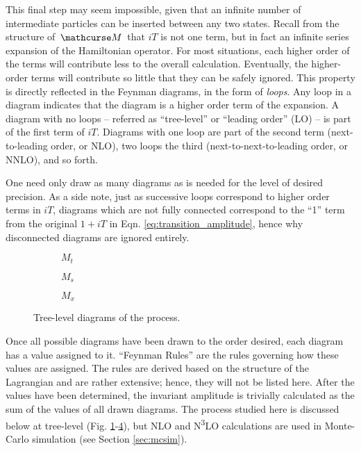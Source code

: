     This final step may seem impossible, given that an infinite number of intermediate particles can be inserted between any two states.
    Recall from the structure of $\invAmp$ that $iT$ is not one term, but in fact an infinite series expansion of the Hamiltonian operator.
    For most situations, each higher order of the terms will contribute less to the overall calculation.
    Eventually, the higher-order terms will contribute so little that they can be safely ignored.
    This property is directly reflected in the Feynman diagrams, in the form of \textit{loops}.
    Any loop in a diagram indicates that the diagram is a higher order term of the expansion.
    A diagram with no loops -- referred as ``tree-level'' or ``leading order'' (LO) -- is part of the first term of $iT$.
    Diagrams with one loop are part of the second term (next-to-leading order, or NLO),
        two loops the third (next-to-next-to-leading order, or NNLO), and so forth.

    One need only draw as many diagrams as is needed for the level of desired precision.
    As a side note, just as successive loops correspond to higher order terms in $iT$,
        diagrams which are not fully connected correspond to the ``1'' term from the original $1+iT$ in Eqn. \ref{eq:transition_amplitude},
        hence why disconnected diagrams are ignored entirely.

    \begin{figure}
    \centering
    \begin{subfigure}{0.32\textwidth} 
         
        \caption{$M_t$}
        \label{fig:tree_level_vbfhh:kv}
    \end{subfigure}
    \begin{subfigure}{0.32\textwidth}
         
        \caption{$M_s$}
        \label{fig:tree_level_vbfhh:kl}
    \end{subfigure}
    \begin{subfigure}{0.32\textwidth}
         
        \caption{$M_x$}
        \label{fig:tree_level_vbfhh:k2v}
    \end{subfigure}
    \caption{Tree-level diagrams of the \hhproc process.}
    \end{figure}

    Once all possible diagrams have been drawn to the order desired, each diagram has a value assigned to it.
    ``Feynman Rules'' are the rules governing how these values are assigned.
    The rules are derived based on the structure of the Lagrangian and are rather extensive;
        hence, they will not be listed here.
    After the values have been determined, the invariant amplitude is trivially calculated as the sum of the values of all drawn diagrams.
    The \hhproc process studied here is discussed below at tree-level
        (Fig. \ref{fig:tree_level_vbfhh:kv}-\ref{fig:tree_level_vbfhh:k2v}),
        but NLO and N\textsuperscript{3}LO calculations are used in Monte-Carlo simulation (see Section \ref{sec:mcsim}).


